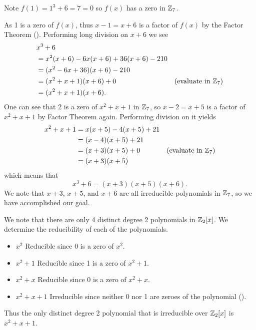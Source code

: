 \begin{questions}
    \item \begin{partquestions}{\roman*}
        \item Note $f(1) = 1^3 + 6 = 7 = 0$ so $f(x)$ has a zero in $\mathbb{Z}_7$.

        \item As 1 is a zero of $f(x)$, thus $x-1 = x+6$ is a factor of $f(x)$ by the Factor Theorem (). Performing long division on $x+6$ we see
        \begin{align*}
            &x^3 + 6\\
            &= x^2(x+6) - 6x(x+6) + 36(x+6) - 210\\
            &= (x^2-6x+36)(x+6) - 210\\
            &= (x^2+x+1)(x+6) + 0 & (\text{evaluate in }\mathbb{Z}_7)\\
            &= (x^2+x+1)(x+6).
        \end{align*}
        One can see that 2 is a zero of $x^2 + x + 1$ in $\mathbb{Z}_7$, so $x - 2 = x+5$ is a factor of $x^2 + x + 1$ by Factor Theorem again. Performing division on it yields
        \begin{align*}
            x^2 + x + 1 &= x(x+5) - 4(x+5) + 21\\
            &= (x-4)(x+5) + 21\\
            &= (x+3)(x+5) + 0 & (\text{evaluate in }\mathbb{Z}_7)\\
            &= (x+3)(x+5)
        \end{align*}
        which means that
        \[
            x^3 + 6 = (x+3)(x+5)(x+6).
        \]
        We note that $x+3$, $x+5$, and $x+6$ are all irreducible polynomials in $\mathbb{Z}_7$, so we have accomplished our goal.
    \end{partquestions}

    \item \begin{partquestions}{\alph*}
        \item We note that there are only 4 distinct degree 2 polynomials in $\mathbb{Z}_2[x]$. We determine the reducibility of each of the polynomials.
        \begin{itemize}
            \item $\boxed{x^2}$ Reducible since 0 is a zero of $x^2$.
            \item $\boxed{x^2 + 1}$ Reducible since 1 is a zero of $x^2 + 1$.
            \item $\boxed{x^2+x}$ Reducible since 0 is a zero of $x^2 + x$.
            \item $\boxed{x^2+x+1}$ Irreducible since neither 0 nor 1 are zeroes of the polynomial ().
        \end{itemize}
        Thus the only distinct degree 2 polynomial that is irreducible over $\mathbb{Z}_2[x]$ is $x^2+x+1$.


\end{partquestions}
\end{questions}
